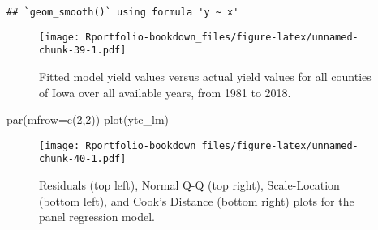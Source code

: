 \documentclass[
]{book}
\newenvironment{Shaded}{\begin{snugshade}}{\end{snugshade}}
\newcommand{\AttributeTok}[1]{\textcolor[rgb]{0.77,0.63,0.00}{#1}}
\newcommand{\DecValTok}[1]{\textcolor[rgb]{0.00,0.00,0.81}{#1}}
\newcommand{\FunctionTok}[1]{\textcolor[rgb]{0.00,0.00,0.00}{#1}}
\newcommand{\NormalTok}[1]{#1}
\newcommand{\OtherTok}[1]{\textcolor[rgb]{0.56,0.35,0.01}{#1}}
\newcommand{\SpecialCharTok}[1]{\textcolor[rgb]{0.00,0.00,0.00}{#1}}
\newcommand{\StringTok}[1]{\textcolor[rgb]{0.31,0.60,0.02}{#1}}
\begin{document}
\begin{Shaded}
\end{Shaded}

\begin{verbatim}
## `geom_smooth()` using formula 'y ~ x'
\end{verbatim}

\begin{figure}
\centering
\texttt{[image: Rportfolio-bookdown\_files/figure-latex/unnamed-chunk-39-1.pdf]}
\caption{\label{fig:unnamed-chunk-39}Fitted model yield values versus actual yield values for all counties of Iowa over all available years, from 1981 to 2018.}
\end{figure}

\begin{Shaded}
\begin{Highlighting}[]
\FunctionTok{par}\NormalTok{(}\AttributeTok{mfrow=}\FunctionTok{c}\NormalTok{(}\DecValTok{2}\NormalTok{,}\DecValTok{2}\NormalTok{))}
\FunctionTok{plot}\NormalTok{(ytc\_lm)}
\end{Highlighting}
\end{Shaded}

\begin{figure}
\centering
\texttt{[image: Rportfolio-bookdown\_files/figure-latex/unnamed-chunk-40-1.pdf]}
\caption{\label{fig:unnamed-chunk-40}Residuals (top left), Normal Q-Q (top right), Scale-Location (bottom left), and Cook's Distance (bottom right) plots for the panel regression model.}
\end{figure}
\end{document}

